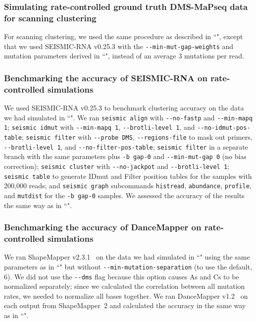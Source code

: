 \documentclass[unnumsec,webpdf,contemporary,large]{oup-authoring-template}%
\theoremstyle{thmstyleone}%
\theoremstyle{thmstyletwo}%
\theoremstyle{thmstylethree}%
\begin{document}
\subsubsection{Simulating rate-controlled ground truth DMS-MaPseq data for scanning clustering}
\label{sim-clusterscan-rate}

For scanning clustering, we used the same procedure as described in ``", except that we used SEISMIC-RNA v0.25.3 with the \verb|--min-mut-gap-weights| and mutation parameters derived in ``", instead of an average 3 mutations per read.

\subsubsection{Benchmarking the accuracy of SEISMIC-RNA on rate-controlled simulations}

We used SEISMIC-RNA v0.25.3 to benchmark clustering accuracy on the data we had simulated in ``".
We ran \verb|seismic align| with \verb|--no-fastp| and \verb|--min-mapq 1|; \verb|seismic idmut| with \verb|--min-mapq 1|, \verb|--brotli-level 1|, and \verb|--no-idmut-pos-table|; \verb|seismic filter| with \verb|--probe DMS|, \verb|--regions-file| to mask out primers, \verb|--brotli-level 1|, and \verb|--no-filter-pos-table|; \verb|seismic filter| in a separate branch with the same parameters plus \verb|-b gap-0| and \verb|--min-mut-gap 0| (no bias correction); \verb|seismic cluster| with \verb|--no-jackpot| and \verb|--brotli-level 1|; \verb|seismic table| to generate IDmut and Filter position tables for the samples with 200,000 reads; and \verb|seismic graph| subcommands \verb|histread|, \verb|abundance|, \verb|profile|, and \verb|mutdist| for the \verb|-b gap-0| samples.
We assessed the accuracy of the results the same way as in ``".

\subsubsection{Benchmarking the accuracy of DanceMapper on rate-controlled simulations}

We ran ShapeMapper v2.3.1~\cite{Busan2018} on the data we had simulated in ``" using the same parameters as in ``" but without \verb|--min-mutation-separation| (to use the default, 6).
We did not use the \verb|--dms| flag because this option causes As and Cs to be normalized separately; since we calculated the correlation between all mutation rates, we needed to normalize all bases together.
We ran DanceMapper v1.2~\cite{Olson2022} on each output from ShapeMapper~2 and calculated the accuracy in the same way as in ``".
\end{document}
